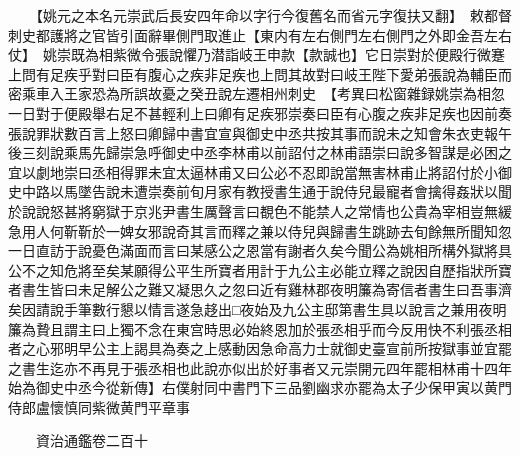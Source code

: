 　　【姚元之本名元崇武后長安四年命以字行今復舊名而省元字復扶又翻】　敕都督刺史都護將之官皆引面辭畢側門取進止【東内有左右側門左右側門之外即金吾左右仗】　姚崇既為相紫微令張說懼乃潜詣岐王申款【款誠也】它日崇對於便殿行微蹇上問有足疾乎對曰臣有腹心之疾非足疾也上問其故對曰岐王陛下愛弟張說為輔臣而密乘車入王家恐為所誤故憂之癸丑說左遷相州刺史　【考異曰松窗雜録姚崇為相忽一日對于便殿舉右足不甚輕利上曰卿有足疾邪崇奏曰臣有心腹之疾非足疾也因前奏張說罪狀數百言上怒曰卿歸中書宜宣與御史中丞共按其事而說未之知會朱衣吏報午後三刻說乘馬先歸崇急呼御史中丞李林甫以前詔付之林甫語崇曰說多智謀是必困之宜以劇地崇曰丞相得罪未宜太逼林甫又曰公必不忍即說當無害林甫止將詔付於小御史中路以馬墜告說未遭崇奏前旬月家有教授書生通于說侍兒最寵者會擒得姦狀以聞於說說怒甚將窮獄于京兆尹書生厲聲言曰覩色不能禁人之常情也公貴為宰相豈無緩急用人何靳靳於一婢女邪說奇其言而釋之兼以侍兒與歸書生跳跡去旬餘無所聞知忽一日直訪于說憂色滿面而言曰某感公之恩當有謝者久矣今聞公為姚相所構外獄將具公不之知危將至矣某願得公平生所寶者用計于九公主必能立釋之說因自歷指狀所寶者書生皆曰未足解公之難又凝思久之忽曰近有雞林郡夜明簾為寄信者書生曰吾事濟矣因請說手筆數行懇以情言遂急趍出□夜始及九公主邸第書生具以說言之兼用夜明簾為贄且謂主曰上獨不念在東宫時思必始終恩加於張丞相乎而今反用快不利張丞相者之心邪明早公主上謁具為奏之上感動因急命高力士就御史臺宣前所按獄事並宜罷之書生迄亦不再見于張丞相也此說亦似出於好事者又元崇開元四年罷相林甫十四年始為御史中丞今從新傳】右僕射同中書門下三品劉幽求亦罷為太子少保甲寅以黄門侍郎盧懷慎同紫微黄門平章事

　　資治通鑑卷二百十


    


 


 



 

 
  







 


　　
　　
　
　
　


　　

　















